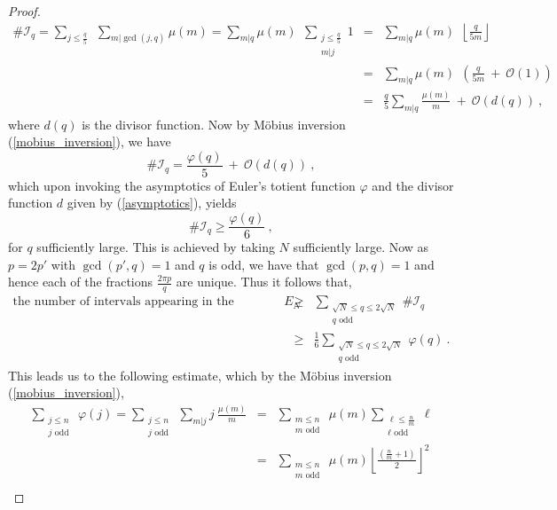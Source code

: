 \documentclass[12pt]{amsart}
\theoremstyle{definition}
\numberwithin{equation}{section}
\begin{document}
\begin{proof}
\begin{eqnarray*}
\#\mathcal{I}_q = \sum_{j \le \frac{q}{5}}\:\: \sum_{m| \gcd(j,q)} \mu(m) = \sum_{m|q} \mu(m) \:\:\sum_{\substack{j \le \frac{q}{5} \\ m|j}} 1 &=& \sum_{m|q} \mu(m) \:\: \left\lfloor \frac{q}{5m}\right\rfloor \\
&=& \sum_{m|q} \mu(m) \:\: \left( \frac{q}{5m} \:+\: \mathcal{O}(1)\right) \\
&=& \frac{q}{5}\sum_{m|q} \frac{\mu(m)}{m}  \:+\: \mathcal{O}\left(d(q)\right)\:,
\end{eqnarray*} 
where $d(q)$ is the divisor function. Now by M\"obius inversion (\ref{mobius_inversion}), we have
\begin{equation*}
\#\mathcal{I}_q= \frac{\varphi(q)}{5} \:+\:\mathcal{O}(d(q))\:,
\end{equation*}
which upon invoking the asymptotics of Euler's totient function $\varphi$ and the divisor function $d$ given by (\ref{asymptotics}), yields
\begin{equation*}
\#\mathcal{I}_q \ge \frac{\varphi(q)}{6}\:,
\end{equation*}
for $q$ sufficiently large. This is achieved by taking $N$ sufficiently large. Now as $p=2p'$ with $\gcd(p',q)=1$ and $q$ is odd, we have that $\gcd(p,q)=1$ and hence each of the fractions $\frac{2\pi p}{q}$ are unique. Thus it follows that,
\begin{eqnarray} \label{counting_lemma_eq2}
\text{the number of intervals appearing in the definition of } E_N &\ge & \sum_{\substack{\sqrt{N} \le q \le 2\sqrt{N} \\ q \text{ odd }}} \#\mathcal{I}_q \nonumber\\
&\ge & \frac{1}{6} \sum_{\substack{\sqrt{N} \le q \le 2\sqrt{N} \\ q \text{ odd }}} \varphi(q)\:.
\end{eqnarray}
This leads us to the following estimate, which by the M\"obius inversion (\ref{mobius_inversion}),
\begin{eqnarray*}
\sum_{\substack{j \le n \\ j \text{ odd }}} \varphi(j) = \sum_{\substack{j \le n \\ j \text{ odd }}}\sum_{m|j}  j\: \frac{\mu(m)}{m} &=& \sum_{\substack{m \le n \\ m \text{ odd }}} \mu(m) \sum_{\substack{\ell \le \frac{n}{m} \\ \ell \text{ odd }}} \ell \\
&=& \sum_{\substack{m \le n \\ m \text{ odd }}} \mu(m) {\left\lfloor \frac{\left(\frac{n}{m}+1\right)}{2} \right\rfloor}^2 \\

\end{eqnarray*}
\end{proof}
\end{document}
